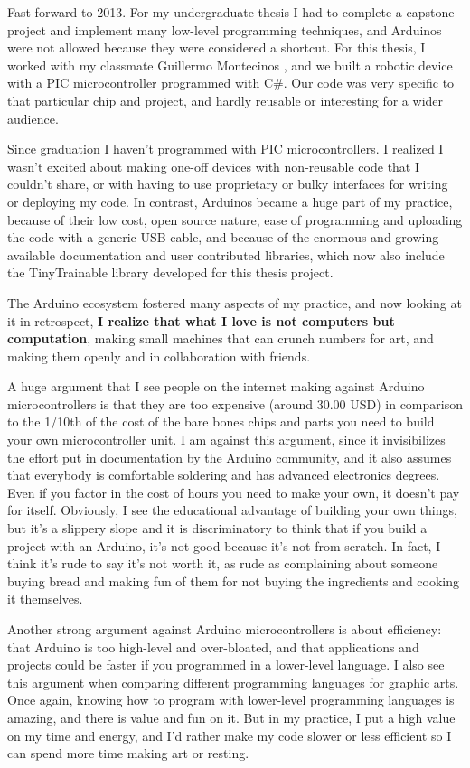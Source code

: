 Fast forward to 2013. For my undergraduate thesis I had to complete a capstone project and implement many low-level programming techniques, and Arduinos were not allowed because they were considered a shortcut. For this thesis, I worked with my classmate Guillermo Montecinos \cite{website-guillermo-montecinos}, and we built a robotic device with a \acrshort{PIC} microcontroller programmed with C\#. Our code was very specific to that particular chip and project, and hardly reusable or interesting for a wider audience.

Since graduation I haven't programmed with \acrshort{PIC} microcontrollers. I realized I wasn't excited about making one-off devices with non-reusable code that I couldn't share, or with having to use proprietary or bulky interfaces for writing or deploying my code. In contrast, Arduinos became a huge part of my practice, because of their low cost, open source nature, ease of programming and uploading the code with a generic USB cable, and because of the enormous and growing available documentation and user contributed libraries, which now also include the TinyTrainable library developed for this thesis project.

The Arduino ecosystem fostered many aspects of my practice, and now looking at it in retrospect, \textbf{I realize that what I love is not computers but computation}, making small machines that can crunch numbers for art, and making them openly and in collaboration with friends.

A huge argument that I see people on the internet making against Arduino microcontrollers is that they are too expensive (around 30.00 USD) in comparison to the 1/10th of the cost of the bare bones chips and parts you need to build your own microcontroller unit. I am against this argument, since it invisibilizes the effort put in documentation by the Arduino community, and it also assumes that everybody is comfortable soldering and has advanced electronics degrees. Even if you factor in the cost of hours you need to make your own, it doesn't pay for itself. Obviously, I see the educational advantage of building your own things, but it's a slippery slope and it is discriminatory to think that if you build a project with an Arduino, it's not good because it's not from scratch. In fact, I think it's rude to say it's not worth it, as rude as complaining about someone buying bread and making fun of them for not buying the ingredients and cooking it themselves.

Another strong argument against Arduino microcontrollers is about efficiency: that Arduino is too high-level and over-bloated, and that applications and projects could be faster if you programmed in a lower-level language. I also see this argument when comparing different programming languages for graphic arts. Once again, knowing how to program with lower-level programming languages is amazing, and there is value and fun on it. But in my practice, I put a high value on my time and energy, and I'd rather make my code slower or less efficient so I can spend more time making art or resting.

